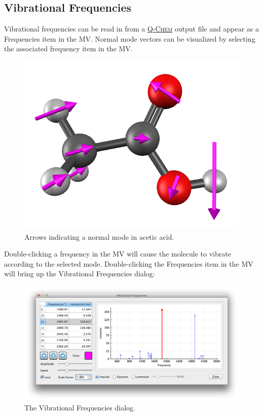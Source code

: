 \documentclass[a4paper,12pt]{article}
\newcommand{\qchem}{\href{https://q-chem.com}{{\scshape Q-Chem}}}
\begin{document}
\subsection{Vibrational Frequencies}

Vibrational frequencies can be read in from a \qchem{} output file and appear
as a Frequencies item in the MV.  Normal mode vectors can be visualized by
selecting the associated frequency item in the MV.
\begin{figure}[h]
\begin{center}
\includegraphics[scale=0.23]{figures/VibMode.png}
\caption{Arrows indicating a normal mode in acetic acid.}
\end{center}
\end{figure}

Double-clicking a frequency in the MV will cause the molecule to vibrate
according to the selected mode.  Double-clicking the Frequencies item in the 
MV will bring up the Vibrational Frequencies dialog:
\begin{figure}[h]
\begin{center}
\includegraphics[scale=0.40]{figures/Frequencies.png}
\caption{The Vibrational Frequencies dialog.}
\end{center}
\end{figure}
\end{document}
